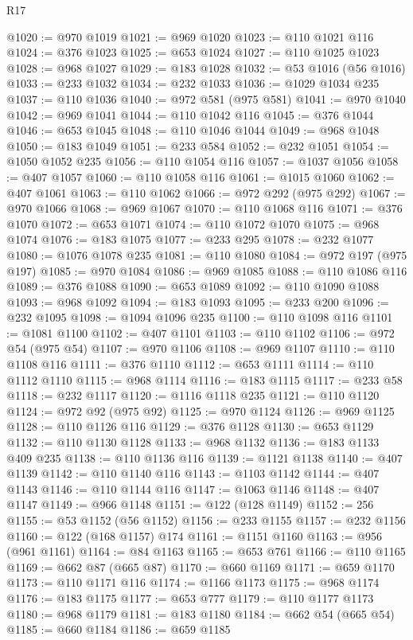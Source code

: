 \begin{lexlean}{R17}
\begin{coremodule}
@1020 := @970 @1019
@1021 := @969 @1020
@1023 := @110 @1021 @116
@1024 := @376 @1023
@1025 := @653 @1024
@1027 := @110 @1025 @1023
@1028 := @968 @1027
@1029 := @183 @1028
@1032 := @53 @1016 (@56 @1016)
@1033 := @233 @1032
@1034 := @232 @1033
@1036 := @1029 @1034 @235
@1037 := @110 @1036
@1040 := @972 @581 (@975 @581)
@1041 := @970 @1040
@1042 := @969 @1041
@1044 := @110 @1042 @116
@1045 := @376 @1044
@1046 := @653 @1045
@1048 := @110 @1046 @1044
@1049 := @968 @1048
@1050 := @183 @1049
@1051 := @233 @584
@1052 := @232 @1051
@1054 := @1050 @1052 @235
@1056 := @110 @1054 @116
@1057 := @1037 @1056
@1058 := @407 @1057
@1060 := @110 @1058 @116
@1061 := @1015 @1060
@1062 := @407 @1061
@1063 := @110 @1062
@1066 := @972 @292 (@975 @292)
@1067 := @970 @1066
@1068 := @969 @1067
@1070 := @110 @1068 @116
@1071 := @376 @1070
@1072 := @653 @1071
@1074 := @110 @1072 @1070
@1075 := @968 @1074
@1076 := @183 @1075
@1077 := @233 @295
@1078 := @232 @1077
@1080 := @1076 @1078 @235
@1081 := @110 @1080
@1084 := @972 @197 (@975 @197)
@1085 := @970 @1084
@1086 := @969 @1085
@1088 := @110 @1086 @116
@1089 := @376 @1088
@1090 := @653 @1089
@1092 := @110 @1090 @1088
@1093 := @968 @1092
@1094 := @183 @1093
@1095 := @233 @200
@1096 := @232 @1095
@1098 := @1094 @1096 @235
@1100 := @110 @1098 @116
@1101 := @1081 @1100
@1102 := @407 @1101
@1103 := @110 @1102
@1106 := @972 @54 (@975 @54)
@1107 := @970 @1106
@1108 := @969 @1107
@1110 := @110 @1108 @116
@1111 := @376 @1110
@1112 := @653 @1111
@1114 := @110 @1112 @1110
@1115 := @968 @1114
@1116 := @183 @1115
@1117 := @233 @58
@1118 := @232 @1117
@1120 := @1116 @1118 @235
@1121 := @110 @1120
@1124 := @972 @92 (@975 @92)
@1125 := @970 @1124
@1126 := @969 @1125
@1128 := @110 @1126 @116
@1129 := @376 @1128
@1130 := @653 @1129
@1132 := @110 @1130 @1128
@1133 := @968 @1132
@1136 := @183 @1133 @409 @235
@1138 := @110 @1136 @116
@1139 := @1121 @1138
@1140 := @407 @1139
@1142 := @110 @1140 @116
@1143 := @1103 @1142
@1144 := @407 @1143
@1146 := @110 @1144 @116
@1147 := @1063 @1146
@1148 := @407 @1147
@1149 := @966 @1148
@1151 := @122 (@128 @1149)
@1152 := 256
@1155 := @53 @1152 (@56 @1152)
@1156 := @233 @1155
@1157 := @232 @1156
@1160 := @122 (@168 @1157) @174
@1161 := @1151 @1160
@1163 := @956 (@961 @1161)
@1164 := @84 @1163
@1165 := @653 @761
@1166 := @110 @1165
@1169 := @662 @87 (@665 @87)
@1170 := @660 @1169
@1171 := @659 @1170
@1173 := @110 @1171 @116
@1174 := @1166 @1173
@1175 := @968 @1174
@1176 := @183 @1175
@1177 := @653 @777
@1179 := @110 @1177 @1173
@1180 := @968 @1179
@1181 := @183 @1180
@1184 := @662 @54 (@665 @54)
@1185 := @660 @1184
@1186 := @659 @1185

\end{coremodule}
\end{lexlean}
